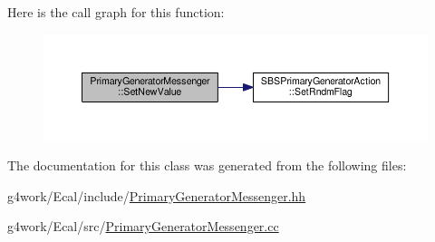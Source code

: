 Here is the call graph for this function\-:\nopagebreak
\begin{figure}[H]
\begin{center}
\leavevmode
\includegraphics[width=350pt]{class_primary_generator_messenger_a0572868c7755cf589403cdad31af87c0_cgraph}
\end{center}
\end{figure}




The documentation for this class was generated from the following files\-:\begin{DoxyCompactItemize}
\item 
g4work/\-Ecal/include/\hyperlink{_primary_generator_messenger_8hh}{Primary\-Generator\-Messenger.\-hh}\item 
g4work/\-Ecal/src/\hyperlink{_primary_generator_messenger_8cc}{Primary\-Generator\-Messenger.\-cc}\end{DoxyCompactItemize}
